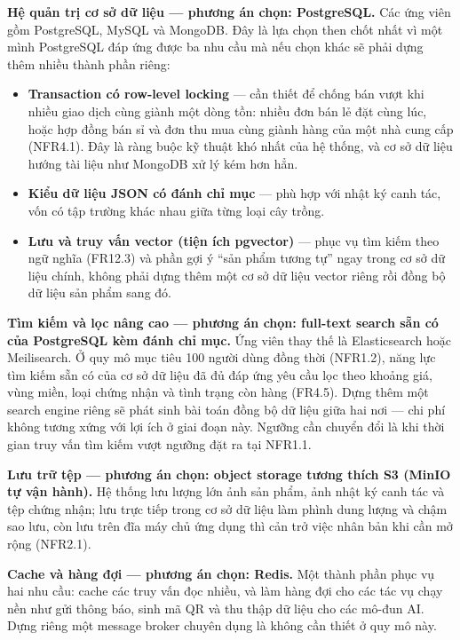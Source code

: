 \noindent\textbf{Hệ quản trị cơ sở dữ liệu --- phương án chọn: PostgreSQL.} Các ứng viên gồm PostgreSQL, MySQL và MongoDB. Đây là lựa chọn then chốt nhất vì một mình PostgreSQL đáp ứng được ba nhu cầu mà nếu chọn khác sẽ phải dựng thêm nhiều thành phần riêng:
\begin{itemize}
    \item \textbf{Transaction có row-level locking} --- cần thiết để chống bán vượt khi nhiều giao dịch cùng giành một dòng tồn: nhiều đơn bán lẻ đặt cùng lúc, hoặc hợp đồng bán sỉ và đơn thu mua cùng giành hàng của một nhà cung cấp (NFR4.1). Đây là ràng buộc kỹ thuật khó nhất của hệ thống, và cơ sở dữ liệu hướng tài liệu như MongoDB xử lý kém hơn hẳn.
    \item \textbf{Kiểu dữ liệu JSON có đánh chỉ mục} --- phù hợp với nhật ký canh tác, vốn có tập trường khác nhau giữa từng loại cây trồng.
    \item \textbf{Lưu và truy vấn vector (tiện ích pgvector)} --- phục vụ tìm kiếm theo ngữ nghĩa (FR12.3) và phần gợi ý ``sản phẩm tương tự'' ngay trong cơ sở dữ liệu chính, không phải dựng thêm một cơ sở dữ liệu vector riêng rồi đồng bộ dữ liệu sản phẩm sang đó.
\end{itemize}

\noindent\textbf{Tìm kiếm và lọc nâng cao --- phương án chọn: full-text search sẵn có của PostgreSQL kèm đánh chỉ mục.} Ứng viên thay thế là Elasticsearch hoặc Meilisearch. Ở quy mô mục tiêu 100 người dùng đồng thời (NFR1.2), năng lực tìm kiếm sẵn có của cơ sở dữ liệu đã đủ đáp ứng yêu cầu lọc theo khoảng giá, vùng miền, loại chứng nhận và tình trạng còn hàng (FR4.5). Dựng thêm một search engine riêng sẽ phát sinh bài toán đồng bộ dữ liệu giữa hai nơi --- chi phí không tương xứng với lợi ích ở giai đoạn này. Ngưỡng cần chuyển đổi là khi thời gian truy vấn tìm kiếm vượt ngưỡng đặt ra tại NFR1.1.

\noindent\textbf{Lưu trữ tệp --- phương án chọn: object storage tương thích S3 (MinIO tự vận hành).} Hệ thống lưu lượng lớn ảnh sản phẩm, ảnh nhật ký canh tác và tệp chứng nhận; lưu trực tiếp trong cơ sở dữ liệu làm phình dung lượng và chậm sao lưu, còn lưu trên đĩa máy chủ ứng dụng thì cản trở việc nhân bản khi cần mở rộng (NFR2.1).

\noindent\textbf{Cache và hàng đợi --- phương án chọn: Redis.} Một thành phần phục vụ hai nhu cầu: cache các truy vấn đọc nhiều, và làm hàng đợi cho các tác vụ chạy nền như gửi thông báo, sinh mã QR và thu thập dữ liệu cho các mô-đun AI. Dựng riêng một message broker chuyên dụng là không cần thiết ở quy mô này.

